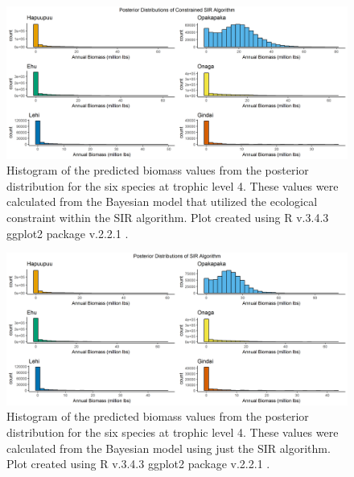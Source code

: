 \documentclass[oneside,12pt,final]{sty/ucthesis-CA2012}
\let\cite\citep                             %
\begin{document}
\begin{mainmatter}
\begin{figure}[H]
     \centering
       \includegraphics[width=\textwidth]{fig/post_constrained_sir}
    \caption{Histogram of the predicted biomass values from the posterior distribution for the six species at trophic level 4. These values were calculated from the Bayesian model that utilized the ecological constraint within the SIR algorithm. Plot created using R v.3.4.3 \cite{Rcite} ggplot2 package v.2.2.1 \cite{ggplot}.}
    \label{postconstsir}
\end{figure}

\begin{figure}[H]
     \centering
       \includegraphics[width=\textwidth]{fig/post_sir}
    \caption{Histogram of the predicted biomass values from the posterior distribution for the six species at trophic level 4. These values were calculated from the Bayesian model using just the SIR algorithm. Plot created using R v.3.4.3 \cite{Rcite} ggplot2 package v.2.2.1 \cite{ggplot}.}
    \label{postsir}
\end{figure}


\end{mainmatter}
\end{document}
